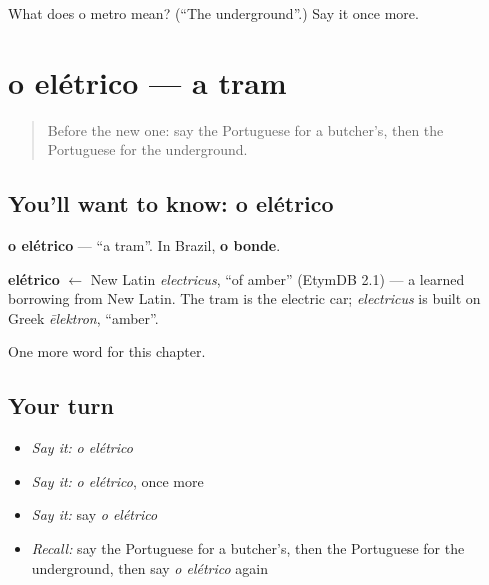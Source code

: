 \begin{tcolorbox}[breakable,colback=teal!4,colframe=teal!35!black,title={Before you move on}]
What does o metro mean? (\textquotedblleft{}The underground\textquotedblright{}.) Say it once more.
\end{tcolorbox}
\section[o elétrico]{o elétrico — a tram}

\label{lesson:PT-C91-eletrico}



\begin{quote}
Before the new one: say the Portuguese for a butcher's, then the Portuguese for the underground.
\end{quote}

\subsection*{You'll want to know: o elétrico}
\textbf{o elétrico} — \textquotedblleft{}a tram\textquotedblright{}. In Brazil, \textbf{o bonde}.

\begin{cousinweb}
\textbf{elétrico} $\leftarrow$ New Latin \emph{electricus}, \textquotedblleft{}of amber\textquotedblright{} (EtymDB 2.1) — a learned borrowing from New Latin. The tram is the electric car; \emph{electricus} is built on Greek \emph{ēlektron}, \textquotedblleft{}amber\textquotedblright{}.
\end{cousinweb}

\begin{grammarlens}[title={What you've built}]
One more word for this chapter.
\end{grammarlens}

\subsection*{Your turn}
\begin{itemize}
\raggedright
  \item \emph{Say it:} \emph{o elétrico}
  \item \emph{Say it:} \emph{o elétrico}, once more
  \item \emph{Say it:} say \emph{o elétrico}
  \item \emph{Recall:} say the Portuguese for a butcher's, then the Portuguese for the underground, then say \emph{o elétrico} again
\end{itemize}

